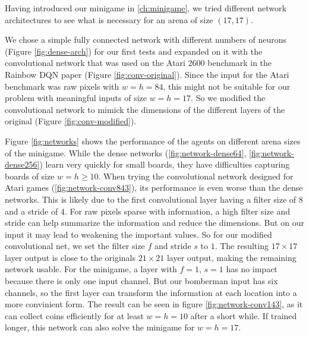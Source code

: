 
Having introduced our minigame in \ref{ch:minigame}, we tried different network architectures to see what is necessary for an arena of size $(17, 17)$.


We chose a simple fully connected network with different numbers of neurons (Figure \ref{fig:dense-arch}) for our first tests and expanded on it with the convolutional network that was used on the Atari 2600 benchmark in the Rainbow DQN paper\cite{Hessel2018RainbowCI} (Figure \ref{fig:conv-original}). Since the input for the Atari benchmark was raw pixels with $w=h=84$, this might not be suitable for our problem with meaningful inputs of size $w=h=17$. So we modified the convolutional network to mimick the dimensions of the different layers of the original (Figure \ref{fig:conv-modified}).


Figure \ref{fig:networks} shows the performance of the agents on different arena sizes of the minigame. While the dense networks (\ref{fig:network-dense64}, \ref{fig:network-dense256}) learn very quickly for small boards, they have difficulties capturing boards of size $w=h\geq10$. When trying the convolutional network designed for Atari games (\ref{fig:network-conv843}), its performance is even worse than the dense networks. This is likely due to the first convolutional layer having a filter size of $8$ and a stride of $4$. For raw pixels sparse with information, a high filter size and stride can help summarize the information and reduce the dimensions. But on our input it may lead to weakening the important values.
So for our modified convolutional net, we set the filter size $f$ and stride $s$ to $1$. The resulting $17\times17$ layer output is close to the originals $21\times21$ layer output, making the remaining network usable. For the minigame, a layer with $f=1$, $s=1$ has no impact because there is only one input channel. But our bomberman input has six channels, so the first layer can transform the information at each location into a more convinient form. The result can be seen in figure \ref{fig:network-conv143}, as it can collect coins efficiently for at least $w=h=10$ after a short while. If trained longer, this network can also solve the minigame for $w=h=17$.






